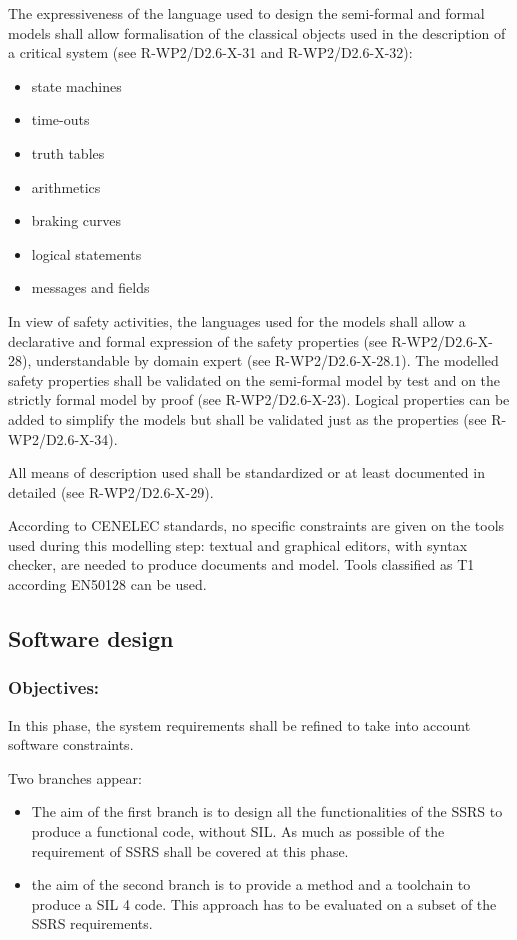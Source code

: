 The expressiveness of the language used to design the semi-formal and formal models shall allow formalisation of the classical objects used in the description of a critical system (see R-WP2/D2.6-X-31 and R-WP2/D2.6-X-32):

\begin{itemize}
\item state machines
\item time-outs
\item truth tables
\item arithmetics
\item braking curves
\item logical statements
\item messages and fields
\end{itemize}


In view of safety activities, the languages used for the models shall allow a declarative and formal expression of the safety properties (see R-WP2/D2.6-X-28), understandable by domain expert (see R-WP2/D2.6-X-28.1). The modelled safety properties shall be validated on the semi-formal model by test and on the strictly formal model by proof (see R-WP2/D2.6-X-23). Logical properties can be added to simplify the models but shall be validated just as the properties (see R-WP2/D2.6-X-34).

All means of description used shall be standardized or at least documented in detailed (see R-WP2/D2.6-X-29). 

According to  CENELEC standards, no specific constraints are given on the tools used during this modelling step: textual and graphical editors, with syntax checker, are needed to  produce documents and model. Tools classified as T1 according EN50128 can be used.



\subsection{Software design}
\label{sec:sw-design}

\subsubsection{Objectives:}
\label{sec:sw-req-objective}


In this phase, the system requirements shall be refined to take into account software constraints.

Two branches appear:
\begin{itemize}
\item  The aim of the first branch  is to  design all the functionalities of the SSRS to  produce a functional code, without SIL. As much as possible of the requirement of SSRS shall be covered at this phase.
\item the aim  of the second branch is to provide a method and a toolchain to produce a SIL 4 code. This approach has to be evaluated on a subset of the SSRS requirements.
\end{itemize}


